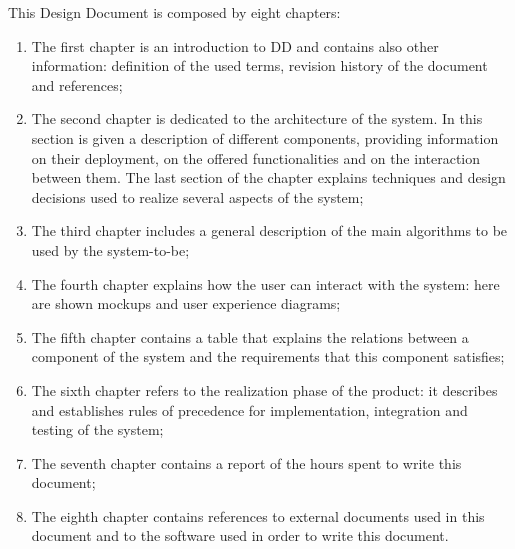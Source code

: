 This Design Document is composed by eight chapters:
\begin{enumerate}
\item The first chapter is an introduction to DD and contains also other information: definition of the used terms, revision history of the document and references;
\item The second chapter is dedicated to the architecture of the system. In this section is given a description of different components, providing information on their deployment, on the offered functionalities and on the interaction between them. The last section of the chapter explains techniques and design decisions used to realize several aspects of the system;
\item The third chapter includes a general description of the main algorithms to be used by the system-to-be;
\item The fourth chapter explains how the user can interact with the system: here are shown mockups and user experience diagrams;
\item The fifth chapter contains a table that explains the relations between a component of the system and the requirements that this component satisfies;
\item The sixth chapter refers to the realization phase of the product: it describes and establishes rules of precedence for implementation, integration and testing of the system;
\item The seventh chapter contains a report of the hours spent to write this document;
\item The eighth chapter contains references to external documents used in this document and to the software used in order to write this document.
\end{enumerate}
